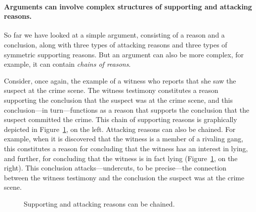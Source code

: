 \documentclass[10pt]{article}
\begin{document}
\paragraph{Arguments can involve complex structures of supporting and attacking reasons.} 

So far we have looked at a simple argument, consisting of a reason and a conclusion, along with three types 
of attacking reasons and three types of symmetric supporting reasons. But an argument can also be more complex, 
for example, it can contain \textit{chains of reasons}. 

Consider, once again, the example of a witness who reports that she saw the suspect at the crime scene. The witness testimony constitutes a 
reason supporting the conclusion that the suspect was at the crime scene, and this conclusion---in turn---functions as a reason 
that supports the conclusion that the suspect committed the crime. This chain of supporting reasons 
is graphically depicted in Figure~\ref{fig:arg2}, on the left. 
Attacking reasons can also be chained. For example, when it is discovered that the witness is a member of a rivaling gang, 
this constitutes a reason for concluding that the witness has an interest in lying, and further, for concluding 
that the witness is in fact lying (Figure~\ref{fig:arg2}, on the right). This conclusion attacks---undercuts, to be precise---the connection 
between the witness testimony and the conclusion the suspect was at the crime scene.

\begin{figure}[bt]
\centering

\caption{Supporting and attacking reasons can be chained. \label{fig:arg2}}
\end{figure}
\end{document}
